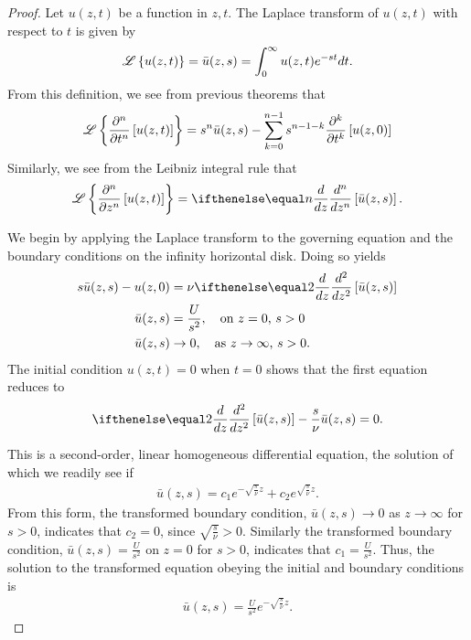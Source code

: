 \begin{proof}
  Let $u(z, t)$ be a function in $z, t$. The Laplace transform of $u(z, t)$ with respect to $t$ is
  given by
  \begin{align*}
    \mathscr{L}\left\{ {u(z, t)} \right\} = \bar{u}(z, s) = \int_0^\infty u(z, t) e^{-st} dt.
  \end{align*}
  From this definition, we see from previous theorems that
  \begin{align*}
    \mathscr{L}\left\{ {\frac{\partial^n}{\partial t^n}\left[u(z, t)\right]} \right\} = s^n \bar{u}(z, s) - \sum_{k=0}^{n-1}s^{n-1-k} \frac{\partial^k}{\partial t^k}\left[u(z, 0)\right]
  \end{align*}
  Similarly, we see from the Leibniz integral rule that
  \begin{align*}
    \laplace{\frac{\partial^n}{\partial z^n}\left[u(z, t)\right]} = \der{z}{n}\left[\bar{u}(z, s)\right].
  \end{align*}

  We begin by applying the Laplace transform to the governing equation and the boundary conditions on the infinity horizontal disk.
  Doing so yields
  \begin{align*}
    s\bar{u}(z, s) - u(z, 0) &= \nu \der{z}{2}\left[\bar{u}(z, s)\right] \\
    \bar{u}(z, s) &= \frac{U}{s^2}, \quad \text{on $z=0$, $s > 0$} \\
    \bar{u}(z, s) &\to 0, \quad \text{as $z\to\infty$, $s > 0$}.
  \end{align*}
  The initial condition $u(z, t) = 0$ when $t = 0$ shows that the first equation reduces to
  \begin{align*}
    \der{z}{2}\left[\bar{u}(z, s)\right] - \frac{s}{\nu}\bar{u}(z, s) = 0.
  \end{align*}

  This is a second-order, linear homogeneous differential equation, the solution of which we readily see if
  \begin{align*}
    \bar{u}(z, s) = c_1 e^{-\sqrt{\frac{s}{\nu}} z} + c_2 e^{\sqrt{\frac{s}{\nu}} z}.
  \end{align*}
  From this form, the transformed boundary condition, $\bar{u}(z, s) \to 0$ as $z\to\infty$ for $s > 0$,
  indicates that $c_2 = 0$, since $\sqrt{\frac{s}{\nu}} > 0$. Similarly the transformed boundary condition,
  $\bar{u}(z, s) = \frac{U}{s^2}$ on $z=0$ for  $s > 0$, indicates that $c_1 = \frac{U}{s^2}$. Thus,
  the solution to the transformed equation obeying the initial and boundary conditions is
  \begin{align*}
    \bar{u}(z, s) = \frac{U}{s^2}e^{-\sqrt{\frac{s}{\nu}} z}.
  \end{align*}


\end{proof}
